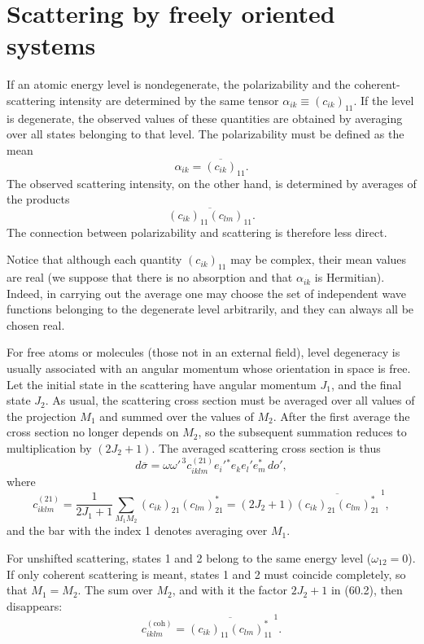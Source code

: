 \section{Scattering by freely oriented systems}

If an atomic energy level is nondegenerate, the polarizability and the coherent-scattering intensity are determined by the same tensor $\alpha_{ik}\equiv(c_{ik})_{11}$. If the level is degenerate, the observed values of these quantities are obtained by averaging over all states belonging to that level. The polarizability must be defined as the mean
\[
\alpha_{ik}=\overline{(c_{ik})}_{11}.
\]
The observed scattering intensity, on the other hand, is determined by averages of the products
\[
\overline{(c_{ik})_{11}(c_{lm})_{11}}.
\]
The connection between polarizability and scattering is therefore less direct.

Notice that although each quantity $(c_{ik})_{11}$ may be complex, their mean values are real (we suppose that there is no absorption and that $\alpha_{ik}$ is Hermitian). Indeed, in carrying out the average one may choose the set of independent wave functions belonging to the degenerate level arbitrarily, and they can always all be chosen real.

For free atoms or molecules (those not in an external field), level degeneracy is usually associated with an angular momentum whose orientation in space is free. Let the initial state in the scattering have angular momentum $J_1$, and the final state $J_2$. As usual, the scattering cross section must be averaged over all values of the projection $M_1$ and summed over the values of $M_2$. After the first average the cross section no longer depends on $M_2$, so the subsequent summation reduces to multiplication by $(2J_2+1)$. The averaged scattering cross section is thus
\begin{equation}
d\overline\sigma=\omega\omega'^{\,3}c_{iklm}^{(21)}e_i'{}^*e_ke_l'e_m^*\,do',
\tag{60.1}
\end{equation}
where
\begin{equation}
c_{iklm}^{(21)}=\frac1{2J_1+1}\sum_{M_1M_2}(c_{ik})_{21}(c_{lm})_{21}^*
=(2J_2+1)\overline{(c_{ik})_{21}(c_{lm})_{21}^*}^{\,1},
\tag{60.2}
\end{equation}
and the bar with the index 1 denotes averaging over $M_1$.

For unshifted scattering, states 1 and 2 belong to the same energy level ($\omega_{12}=0$). If only coherent scattering is meant, states 1 and 2 must coincide completely, so that $M_1=M_2$. The sum over $M_2$, and with it the factor $2J_2+1$ in (60.2), then disappears:
\begin{equation}
c_{iklm}^{(\text{coh})}=\overline{(c_{ik})_{11}(c_{lm})_{11}^*}^{\,1}.
\tag{60.3}
\end{equation}

